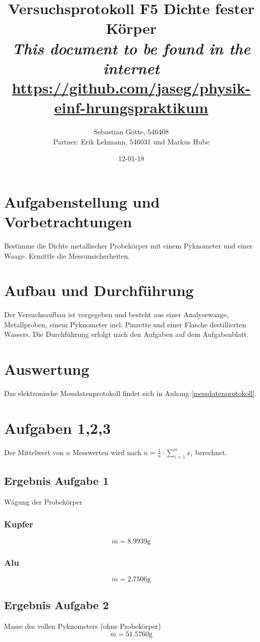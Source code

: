 \documentclass[12pt,a4paper,notitlepage]{article}
\title{Versuchsprotokoll F5 Dichte fester Körper\\
\small\emph{This document to be found in the internet}\\
\url{https://github.com/jaseg/physik-einf-hrungspraktikum}}
\author{Sebastian Götte, 546408\\
Partner: Erik Lehmann, 546031 und Markus Hube}
\date{12-01-18}
\begin{document}
\maketitle
\section{Aufgabenstellung und Vorbetrachtungen}
Bestimme die Dichte metallischer Probekörper mit einem Pyknometer und einer Waage. Ermittle die Messunsicherheiten.
\section{Aufbau und Durchführung}
Der Versuchsaufbau ist vorgegeben und besteht aus einer Analysewaage, Metallproben, einem Pyknometer incl. Pinzette und einer Flasche destillierten Wassers. Die Durchführung erfolgt nach den Aufgaben auf dem Aufgabenblatt.
\section{Auswertung}
Das elektronische Messdatenprotokoll findet sich in Anhang \ref{messdatenprotokoll}.

\section{Aufgaben 1,2,3}
Der Mittelwert von $n$ Messwerten wird nach $\overline n=\frac{1}{n}\cdot\sum_{i=1}^nx_i$ berechnet.
\subsection{Ergebnis Aufgabe 1}
Wägung der Probekörper
\subsubsection{Kupfer}
\begin{equation}
\overline m=8.9939\mathrm{g}
\end{equation}
\subsubsection{Alu}
\begin{equation}
\overline m=2.7506\mathrm{g}
\end{equation}
\subsection{Ergebnis Aufgabe 2}
Masse des vollen Pyknometers (ohne Probekörper)
\begin{equation}
\overline m=51.5760\mathrm{g}
\end{equation}
\end{document}
